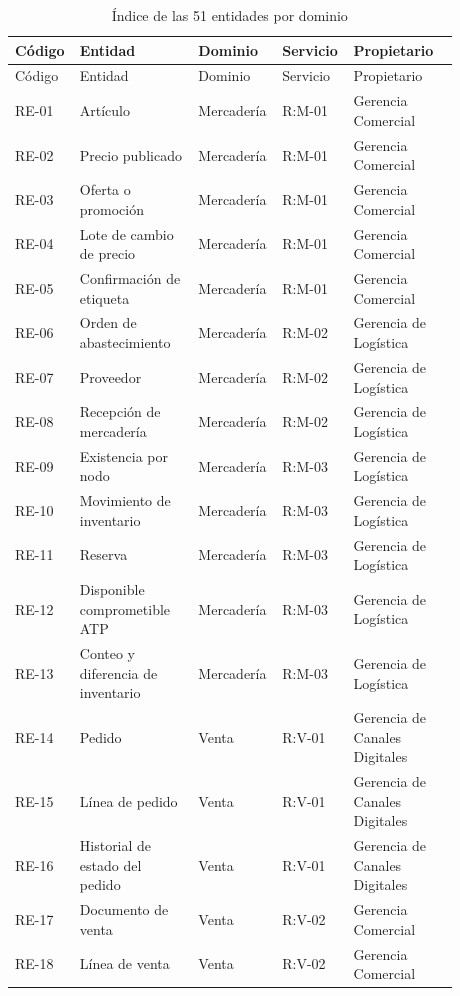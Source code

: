 \documentclass[11pt]{article}
\begin{document}
\begin{longtable}{@{}p{0.090\linewidth}p{0.269\linewidth}p{0.143\linewidth}p{0.143\linewidth}p{0.233\linewidth}@{}}
\caption{Índice de las 51 entidades por dominio}\label{tab:indice_ent}\\
\toprule Código & Entidad & Dominio & Servicio & Propietario \\
\midrule\endfirsthead
\toprule Código & Entidad & Dominio & Servicio & Propietario \\
\midrule\endhead\bottomrule\endlastfoot
RE-01 & Artículo & Mercadería & R:M-01 & Gerencia Comercial \\
RE-02 & Precio publicado & Mercadería & R:M-01 & Gerencia Comercial \\
RE-03 & Oferta o promoción & Mercadería & R:M-01 & Gerencia Comercial \\
RE-04 & Lote de cambio de precio & Mercadería & R:M-01 & Gerencia Comercial \\
RE-05 & Confirmación de etiqueta & Mercadería & R:M-01 & Gerencia Comercial \\
RE-06 & Orden de abastecimiento & Mercadería & R:M-02 & Gerencia de Logística \\
RE-07 & Proveedor & Mercadería & R:M-02 & Gerencia de Logística \\
RE-08 & Recepción de mercadería & Mercadería & R:M-02 & Gerencia de Logística \\
RE-09 & Existencia por nodo & Mercadería & R:M-03 & Gerencia de Logística \\
RE-10 & Movimiento de inventario & Mercadería & R:M-03 & Gerencia de Logística \\
RE-11 & Reserva & Mercadería & R:M-03 & Gerencia de Logística \\
RE-12 & Disponible comprometible ATP & Mercadería & R:M-03 & Gerencia de Logística \\
RE-13 & Conteo y diferencia de inventario & Mercadería & R:M-03 & Gerencia de Logística \\
RE-14 & Pedido & Venta & R:V-01 & Gerencia de Canales Digitales \\
RE-15 & Línea de pedido & Venta & R:V-01 & Gerencia de Canales Digitales \\
RE-16 & Historial de estado del pedido & Venta & R:V-01 & Gerencia de Canales Digitales \\
RE-17 & Documento de venta & Venta & R:V-02 & Gerencia Comercial \\
RE-18 & Línea de venta & Venta & R:V-02 & Gerencia Comercial \\

\end{longtable}
\end{document}
